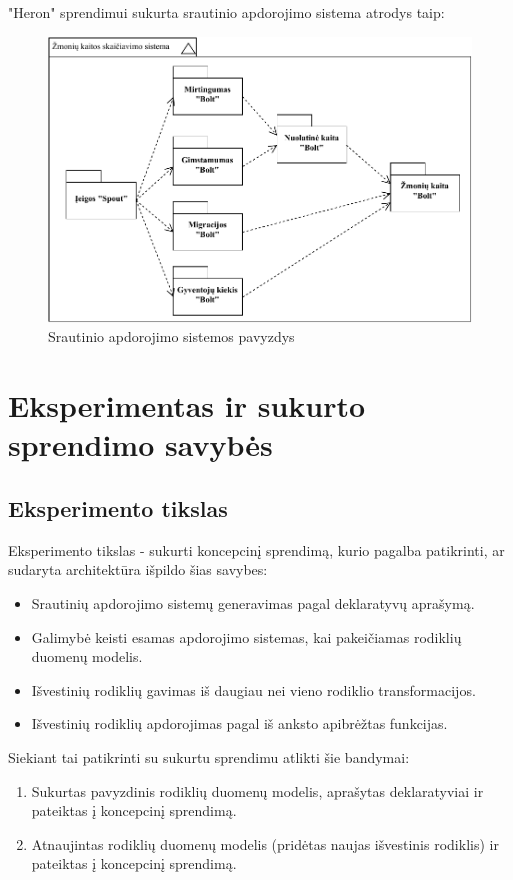 \documentclass{VUMIFPSbakalaurinis}
\begin{document}
"Heron" sprendimui sukurta srautinio apdorojimo sistema atrodys taip:
\begin{figure}[H]
    \centering
    \includegraphics[width=1\textwidth]{img/generuota_sistema.pdf}
    \caption{Srautinio apdorojimo sistemos pavyzdys}
    \label{img:example}
\end{figure}

\section{Eksperimentas ir sukurto sprendimo savybės}

\subsection{Eksperimento tikslas}

Eksperimento tikslas - sukurti koncepcinį sprendimą, kurio pagalba patikrinti, ar sudaryta architektūra išpildo šias savybes:
\begin{itemize}
    \item Srautinių apdorojimo sistemų generavimas pagal deklaratyvų aprašymą.
    \item Galimybė keisti esamas apdorojimo sistemas, kai pakeičiamas rodiklių duomenų modelis.
    \item Išvestinių rodiklių gavimas iš daugiau nei vieno rodiklio transformacijos.
    \item Išvestinių rodiklių apdorojimas pagal iš anksto apibrėžtas funkcijas.
\end{itemize}  

\noindent Siekiant tai patikrinti su sukurtu sprendimu atlikti šie bandymai:
\begin{enumerate}
    \item Sukurtas pavyzdinis rodiklių duomenų modelis, aprašytas deklaratyviai ir pateiktas į koncepcinį sprendimą.
    \item Atnaujintas rodiklių duomenų modelis (pridėtas naujas išvestinis rodiklis) ir pateiktas į koncepcinį sprendimą.
\end{enumerate}
\end{document}

